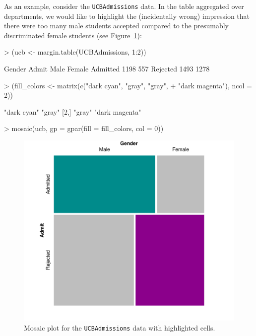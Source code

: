 \documentclass{Z}
\newcommand{\data}[1]{\texttt{#1}}
\begin{document}
As an example, consider the \data{UCBAdmissions} data. 
In the table aggregated over departments, we
would like to highlight the (incidentally wrong) impression that there
were too many male students accepted compared to the presumably
discriminated female students (see Figure~\ref{fig:ucb}):

\begin{Schunk}
\begin{Sinput}
> (ucb <- margin.table(UCBAdmissions, 1:2))
\end{Sinput}
\begin{Soutput}
          Gender
Admit      Male Female
  Admitted 1198    557
  Rejected 1493   1278
\end{Soutput}
\begin{Sinput}
> (fill_colors <- matrix(c("dark cyan", "gray", "gray", 
+     "dark magenta"), ncol = 2))
\end{Sinput}
\begin{Soutput}
     [,1]        [,2]          
[1,] "dark cyan" "gray"        
[2,] "gray"      "dark magenta"
\end{Soutput}
\begin{Sinput}
> mosaic(ucb, gp = gpar(fill = fill_colors, col = 0))
\end{Sinput}
\end{Schunk}

\begin{figure}[h]
\begin{center}
\includegraphics{strucplot-ucbfig}

\caption{Mosaic plot for the \data{UCBAdmissions} data with highlighted cells.}
\label{fig:ucb}
\end{center}
\end{figure}
\end{document}
